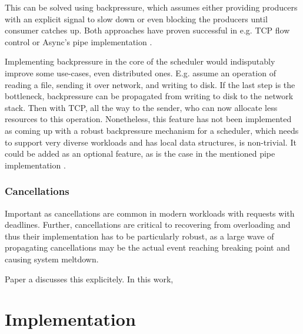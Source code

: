 \documentclass[12pt,a4paper,twoside]{report}
\begin{document}
This can be solved using backpressure, which assumes either providing producers with an explicit signal to slow down or even blocking the producers until consumer catches up. Both approaches have proven successful in e.g. TCP flow control \cite{rfc793} or Async's pipe implementation \cite{async_kernel}. 

Implementing backpressure in the core of the scheduler would indisputably improve some use-cases, even distributed ones. E.g. assume an operation of reading a file, sending it over network, and writing to disk. If the last step is the bottleneck, backpressure can be propagated from writing to disk to the network stack. Then with TCP, all the way to the sender, who can now allocate less resources to this operation. Nonetheless, this feature has not been implemented as coming up with a robust backpressure mechanism for a scheduler, which needs to support very diverse workloads and has local data structures, is non-trivial. It could be added as an optional feature, as is the case in the mentioned pipe implementation \cite{async_kernel}. 


\subsection{Cancellations}
\label{section:cancellations}
Important as cancellations are common in modern workloads with requests with deadlines. Further, cancellations are critical to recovering from overloading and thus their implementation has to be particularly robust, as a large wave of propagating cancellations may be the actual event reaching breaking point and causing system meltdown.  

Paper a discusses this explicitely. In this work,



\chapter{Implementation}
\end{document}
